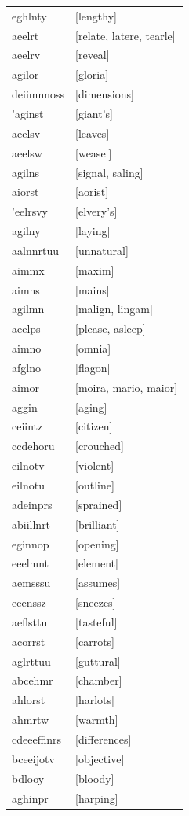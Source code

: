 \documentclass{article}
\begin{document}
\begin{tabular}{ll}
eghlnty & [lengthy] \\
aeelrt & [relate, latere, tearle] \\
aeelrv & [reveal] \\
agilor & [gloria] \\
deiimnnoss & [dimensions] \\
'aginst & [giant's] \\
aeelsv & [leaves] \\
aeelsw & [weasel] \\
agilns & [signal, saling] \\
aiorst & [aorist] \\
'eelrsvy & [elvery's] \\
agilny & [laying] \\
aalnnrtuu & [unnatural] \\
aimmx & [maxim] \\
aimns & [mains] \\
agilmn & [malign, lingam] \\
aeelps & [please, asleep] \\
aimno & [omnia] \\
afglno & [flagon] \\
aimor & [moira, mario, maior] \\
aggin & [aging] \\
ceiintz & [citizen] \\
ccdehoru & [crouched] \\
eilnotv & [violent] \\
eilnotu & [outline] \\
adeinprs & [sprained] \\
abiillnrt & [brilliant] \\
eginnop & [opening] \\
eeelmnt & [element] \\
aemsssu & [assumes] \\
eeenssz & [sneezes] \\
aeflsttu & [tasteful] \\
acorrst & [carrots] \\
aglrttuu & [guttural] \\
abcehmr & [chamber] \\
ahlorst & [harlots] \\
ahmrtw & [warmth] \\
cdeeeffinrs & [differences] \\
bceeijotv & [objective] \\
bdlooy & [bloody] \\
aghinpr & [harping] \\

\end{tabular}
\end{document}
